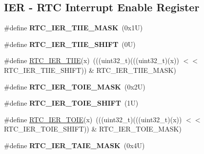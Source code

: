 \subsection*{I\+ER -\/ R\+TC Interrupt Enable Register}
\begin{DoxyCompactItemize}
\item 
\mbox{\label{group___r_t_c___register___masks_ga4401cd4dce34a638f75403a2a3701e6d}} 
\#define {\bfseries R\+T\+C\+\_\+\+I\+E\+R\+\_\+\+T\+I\+I\+E\+\_\+\+M\+A\+SK}~(0x1\+U)
\item 
\mbox{\label{group___r_t_c___register___masks_ga2938c56e7566549f7434b8f02ad6d478}} 
\#define {\bfseries R\+T\+C\+\_\+\+I\+E\+R\+\_\+\+T\+I\+I\+E\+\_\+\+S\+H\+I\+FT}~(0\+U)
\item 
\#define \mbox{\hyperlink{group___r_t_c___register___masks_gabfbef54705a0c0320ffac94154df5628}{R\+T\+C\+\_\+\+I\+E\+R\+\_\+\+T\+I\+IE}}(x)~(((uint32\+\_\+t)(((uint32\+\_\+t)(x)) $<$$<$ R\+T\+C\+\_\+\+I\+E\+R\+\_\+\+T\+I\+I\+E\+\_\+\+S\+H\+I\+FT)) \& R\+T\+C\+\_\+\+I\+E\+R\+\_\+\+T\+I\+I\+E\+\_\+\+M\+A\+SK)
\item 
\mbox{\label{group___r_t_c___register___masks_ga1dfc25308bec00f67925ae796f805d3d}} 
\#define {\bfseries R\+T\+C\+\_\+\+I\+E\+R\+\_\+\+T\+O\+I\+E\+\_\+\+M\+A\+SK}~(0x2\+U)
\item 
\mbox{\label{group___r_t_c___register___masks_gaf9355764ec83dde6e2890f391a469856}} 
\#define {\bfseries R\+T\+C\+\_\+\+I\+E\+R\+\_\+\+T\+O\+I\+E\+\_\+\+S\+H\+I\+FT}~(1\+U)
\item 
\#define \mbox{\hyperlink{group___r_t_c___register___masks_ga32cf27d2d16f386987e4299177578929}{R\+T\+C\+\_\+\+I\+E\+R\+\_\+\+T\+O\+IE}}(x)~(((uint32\+\_\+t)(((uint32\+\_\+t)(x)) $<$$<$ R\+T\+C\+\_\+\+I\+E\+R\+\_\+\+T\+O\+I\+E\+\_\+\+S\+H\+I\+FT)) \& R\+T\+C\+\_\+\+I\+E\+R\+\_\+\+T\+O\+I\+E\+\_\+\+M\+A\+SK)
\item 
\mbox{\label{group___r_t_c___register___masks_gad1bcc4df9a637ec5ab4b611391986c06}} 
\#define {\bfseries R\+T\+C\+\_\+\+I\+E\+R\+\_\+\+T\+A\+I\+E\+\_\+\+M\+A\+SK}~(0x4\+U)
\item 
\mbox{\label{group___r_t_c___register___masks_gae15cd7098592da4c3a2c2563879ae5d8}} 

\end{DoxyCompactItemize}
